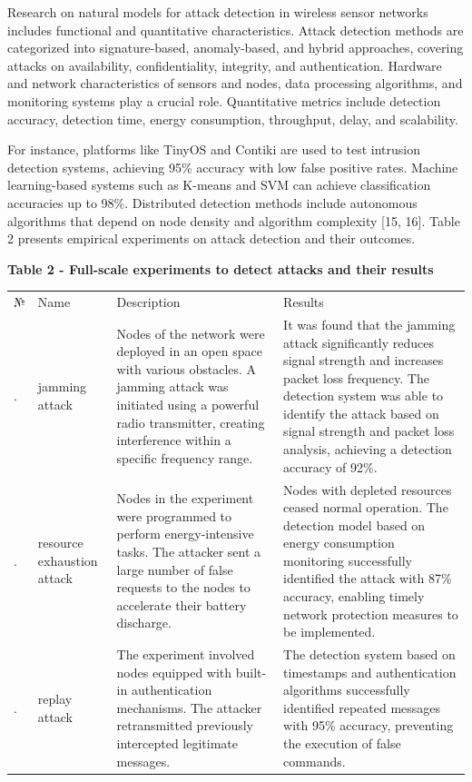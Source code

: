 Research on natural models for attack detection in wireless sensor
networks includes functional and quantitative characteristics. Attack
detection methods are categorized into signature-based, anomaly-based,
and hybrid approaches, covering attacks on availability,
confidentiality, integrity, and authentication. Hardware and network
characteristics of sensors and nodes, data processing algorithms, and
monitoring systems play a crucial role. Quantitative metrics include
detection accuracy, detection time, energy consumption, throughput,
delay, and scalability.

For instance, platforms like TinyOS and Contiki are used to test
intrusion detection systems, achieving 95\% accuracy with low false
positive rates. Machine learning-based systems such as K-means and SVM
can achieve classification accuracies up to 98\%. Distributed detection
methods include autonomous algorithms that depend on node density and
algorithm complexity {[}15, 16{]}. Table 2 presents empirical
experiments on attack detection and their outcomes.

{\bfseries Table 2 - Full-scale experiments to detect attacks and their
results}

\begin{longtable}[]{@{}
  >{\raggedright\arraybackslash}p{}
  >{\raggedright\arraybackslash}p{}
  >{\raggedright\arraybackslash}p{}
  >{\raggedright\arraybackslash}p{}@{}}
\toprule\noalign{}
\endhead
\bottomrule\noalign{}
\endlastfoot
№ & Name & Description & Results \\
1. & jamming attack & Nodes of the network were deployed in an open
space with various obstacles. A jamming attack was initiated using a
powerful radio transmitter, creating interference within a specific
frequency range. & It was found that the jamming attack significantly
reduces signal strength and increases packet loss frequency. The
detection system was able to identify the attack based on signal
strength and packet loss analysis, achieving a detection accuracy of
92\%. \\
2. & resource exhaustion attack & Nodes in the experiment were
programmed to perform energy-intensive tasks. The attacker sent a large
number of false requests to the nodes to accelerate their battery
discharge. & Nodes with depleted resources ceased normal operation. The
detection model based on energy consumption monitoring successfully
identified the attack with 87\% accuracy, enabling timely network
protection measures to be implemented. \\
3. & replay attack & The experiment involved nodes equipped with
built-in authentication mechanisms. The attacker retransmitted
previously intercepted legitimate messages. & The detection system based
on timestamps and authentication algorithms successfully identified
repeated messages with 95\% accuracy, preventing the execution of false
commands. \\
\end{longtable}

